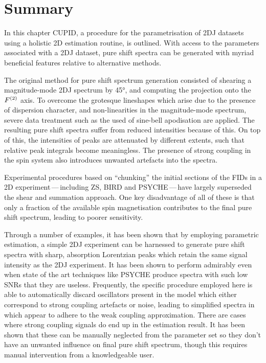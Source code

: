 \section{Summary}
In this chapter \ac{CUPID}, a procedure for the parametrisation of \ac{2DJ} datasets using
a holistic \ac{2D} estimation routine, is outlined.
With access to the parameters associated with a \ac{2DJ} dataset, pure shift
spectra can be generated with myriad beneficial features relative to
alternative methods.

The original method for pure shift spectrum generation consisted of shearing a
magnitude-mode \ac{2DJ} spectrum by \ang{45}, and computing the projection onto
the $F^{(2)}$ axis. To overcome the grotesque lineshapes which arise due to the
presence of dispersion character, and non-linearities in the magnitude-mode
spectrum, severe data treatment such as the used of sine-bell apodisation are
applied. The resulting pure shift spectra suffer from reduced intensities
because of this. On top of this, the intensities of peaks are attenuated by
different extents, such that relative peak integrals become meaningless. The
presence of strong coupling in the spin system also introduces unwanted
artefacts into the spectra.

Experimental procedures  based on ``chunking'' the initial sections of the
\acp{FID} in a \ac{2D} experiment\,---\,including \ac{ZS}, \ac{BIRD} and
\ac{PSYCHE}\,---\,have largely superseded the shear and summation approach.
One key disadvantage of all of these is that only a fraction of the available
spin magnetisation contributes to the final pure shift spectrum, leading to
poorer sensitivity.

Through a number of examples, it has been shown that by employing parametric
estimation, a simple \ac{2DJ} experiment can be harnessed to generate pure
shift spectra with sharp, absorption Lorentzian peaks which retain the same
signal intensity as the \ac{2DJ} experiment. It has been shown to perform
admirably even when state of the art techniques like \ac{PSYCHE} produce
spectra with such low \acp{SNR} that they are useless. Frequently, the specific
procedure employed here is able to automatically discard oscillators present in
the model which either correspond to strong coupling artefacts or noise,
leading to simplified spectra in which appear to adhere to the weak coupling
approximation. There are cases where strong coupling signals do end up in the
estimation result. It has been shown that these can be manually neglected from
the parameter set so they don't have an unwanted influence on final pure shift
spectrum, though this requires manual intervention from a knowledgeable user.

